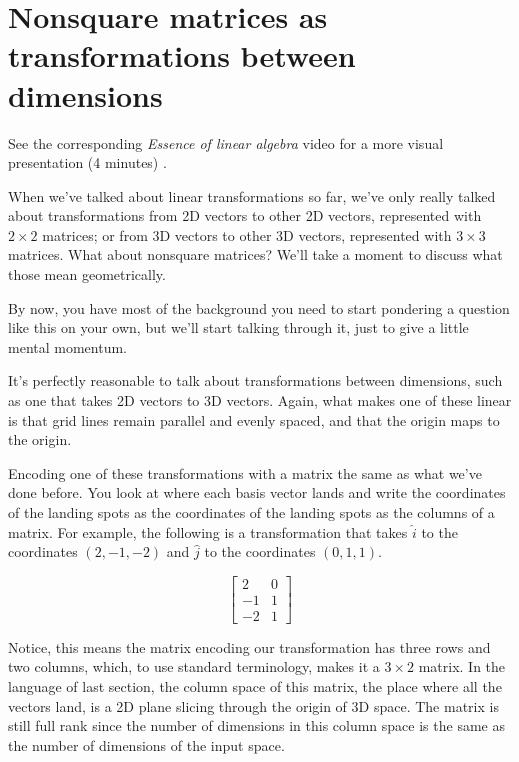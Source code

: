 \section{Nonsquare matrices as transformations between dimensions}

\begin{remark}
  See the corresponding \textit{Essence of linear algebra} video for a more
  visual presentation (4 minutes)
  \cite{bib:linalg_nonsquare_matrices_as_transformations_between_dimensions}.
\end{remark}

When we've talked about linear transformations so far, we've only really talked
about transformations from 2D vectors to other 2D vectors, represented with
$2 \times 2$ matrices; or from 3D vectors to other 3D vectors, represented with
$3 \times 3$ matrices. What about nonsquare matrices? We'll take a moment to
discuss what those mean geometrically.

By now, you have most of the background you need to start pondering a question
like this on your own, but we'll start talking through it, just to give a little
mental momentum.

It's perfectly reasonable to talk about transformations between dimensions, such
as one that takes 2D vectors to 3D vectors. Again, what makes one of these
linear is that grid lines remain parallel and evenly spaced, and that the origin
maps to the origin.

Encoding one of these transformations with a matrix the same as what we've done
before. You look at where each basis vector lands and write the coordinates of
the landing spots as the coordinates of the landing spots as the columns of a
matrix. For example, the following is a transformation that takes $\hat{i}$ to
the coordinates $(2, -1, -2)$ and $\hat{j}$ to the coordinates $(0, 1, 1)$.

\begin{equation*}
  \begin{bmatrix}
    2 & 0 \\
    -1 & 1 \\
    -2 & 1
  \end{bmatrix}
\end{equation*}

Notice, this means the matrix encoding our transformation has three rows and two
columns, which, to use standard terminology, makes it a $3 \times 2$ matrix. In
the language of last section, the column space of this matrix, the place where
all the vectors land, is a 2D plane slicing through the origin of 3D space. The
matrix is still full rank since the number of dimensions in this column space is
the same as the number of dimensions of the input space.

